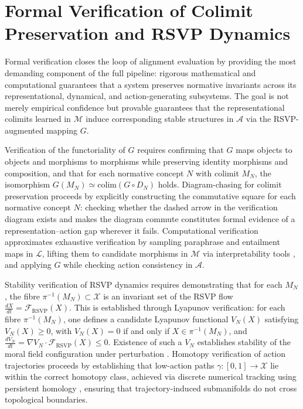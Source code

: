 \documentclass[12pt]{article}
\theoremstyle{definition}
\begin{document}
\section{Formal Verification of Colimit Preservation and RSVP Dynamics}

Formal verification closes the loop of alignment evaluation by providing the
most demanding component of the full pipeline: rigorous mathematical and
computational guarantees that a system preserves normative invariants across its
representational, dynamical, and action-generating subsystems. The goal is not
merely empirical confidence but provable guarantees that the representational
colimits learned in $\mathcal{M}$ induce corresponding stable structures in
$\mathcal{A}$ via the RSVP-augmented mapping $G$.

Verification of the functoriality of $G$ requires confirming that $G$ maps
objects to objects and morphisms to morphisms while preserving identity
morphisms and composition, and that for each normative concept $N$ with colimit
$M_N$, the isomorphism $G(M_N) \simeq \mathrm{colim}(G \circ D_N)$ holds.
Diagram-chasing for colimit preservation proceeds by explicitly constructing the
commutative square for each normative concept $N$: checking whether the dashed
arrow in the verification diagram exists and makes the diagram commute
constitutes formal evidence of a representation--action gap wherever it fails.
Computational verification approximates exhaustive verification by sampling
paraphrase and entailment maps in $\mathcal{L}$, lifting them to candidate
morphisms in $\mathcal{M}$ via interpretability tools \citep{elhage2022}, and
applying $G$ while checking action consistency in $\mathcal{A}$.

Stability verification of RSVP dynamics requires demonstrating that for each
$M_N$, the fibre $\pi^{-1}(M_N) \subset \mathcal{X}$ is an invariant set of
the RSVP flow $\frac{dX}{dt} = \mathcal{F}_{\mathrm{RSVP}}(X)$. This is
established through Lyapunov verification: for each fibre $\pi^{-1}(M_N)$, one
defines a candidate Lyapunov functional $V_N(X)$ satisfying $V_N(X) \geq 0$,
with $V_N(X) = 0$ if and only if $X \in \pi^{-1}(M_N)$, and $\frac{dV_N}{dt}
= \nabla V_N \cdot \mathcal{F}_{\mathrm{RSVP}}(X) \leq 0$. Existence of such a
$V_N$ establishes stability of the moral field configuration under perturbation
\citep{strogatz2018}. Homotopy verification of action trajectories proceeds by
establishing that low-action paths $\gamma : [0,1] \to \mathcal{X}$ lie within
the correct homotopy class, achieved via discrete numerical tracking using
persistent homology \citep{ghrist2014}, ensuring that trajectory-induced
submanifolds do not cross topological boundaries.
\end{document}
